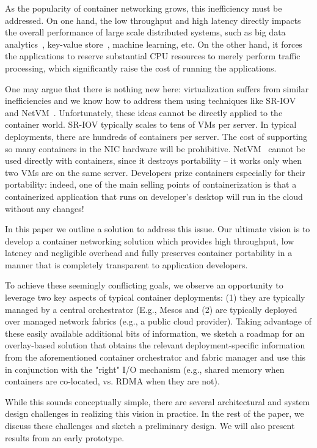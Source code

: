 As the popularity of container networking grows, this inefficiency must be
addressed. On one hand, the low throughput and high latency directly impacts the
overall performance of large scale distributed systems, such as big data
analytics~\cite{choudhury-paper,mapreduce}, key-value
store~\cite{farm,cassandra,bigtable}, machine learning, etc.  On the other hand,
it forces the applications to reserve substantial CPU resources to merely
perform traffic processing, which significantly raise the cost of running the
applications.

One may argue that there is nothing new here: virtualization suffers from
similar inefficiencies and we know how to address them using techniques like
SR-IOV~\cite{sriov} and NetVM~\cite{netvm}. Unfortunately, these ideas cannot be
directly applied to the container world.  SR-IOV typically scales to tens of VMs
per server. In typical deployments, there are hundreds of containers per server.
The cost of supporting so many containers in the NIC hardware will be
prohibitive.  NetVM~\cite{netvm} cannot be used directly with containers, since
it destroys portability -- it works only when two VMs are on the same server.
Developers prize containers especially for their portability: indeed, one of the
main selling points of containerization is that a containerized application that
runs on developer's desktop will run in the cloud without any changes! 

In this paper we outline a solution to address this issue.  Our ultimate vision
is to develop a container networking solution which provides high throughput,
low latency and negligible overhead and fully preserves container portability in
a manner that is completely transparent to application developers. 

To achieve these seemingly conflicting goals, we observe an opportunity to
leverage two key aspects of typical container deployments: (1) they are
typically managed by a central orchestrator (E.g., Mesos
\cite{mesos,kubernetes,xxx} and (2) are typically deployed over managed network
fabrics (e.g., a public cloud provider). Taking advantage of these easily
available additional bits of information, we sketch a roadmap for an
overlay-based solution  that obtains the relevant deployment-specific
information from the aforementioned container orchestrator and fabric manager
and use this in conjunction with the "right" I/O mechanism (e.g., shared memory
when containers are co-located, vs. RDMA when they are not). 

While this sounds conceptually simple, there are several architectural
and system design challenges in realizing this vision in practice. In the rest
of the paper, we discuss these challenges and sketch a preliminary design. We
will also present results from an early prototype.
